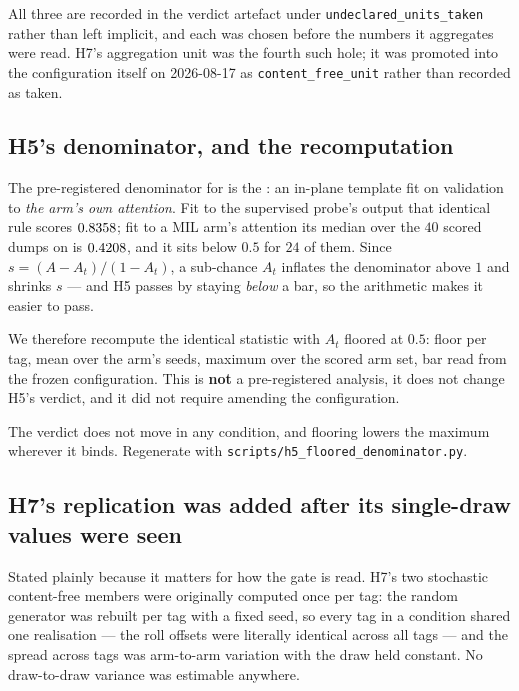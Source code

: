 \documentclass[10pt]{article}
\begin{document}
All three are recorded in the verdict artefact under
\texttt{undeclared\_units\_taken} rather than left implicit, and each was chosen
before the numbers it aggregates were read. H7's aggregation unit was the fourth
such hole; it was promoted into the configuration itself on 2026-08-17 as
\texttt{content\_free\_unit} rather than recorded as taken.

\subsection{H5's denominator, and the recomputation}
\label{sec:h5}

The pre-registered denominator for \pns{} is the \attden{}: an in-plane
template fit on validation to \emph{the arm's own attention}. Fit to the
supervised probe's output that identical rule scores $0.8358$; fit to a MIL
arm's attention its median over the $40$ scored dumps on \condA{} is
$0.4208$, and it sits below $0.5$ for $24$ of them. Since $s = (A - A_t)/(1 - A_t)$, a sub-chance $A_t$
inflates the denominator above $1$ and shrinks $s$ --- and H5 passes by staying
\emph{below} a bar, so the arithmetic makes it easier to pass.

We therefore recompute the identical statistic with $A_t$ floored at $0.5$:
floor per tag, mean over the arm's seeds, maximum over the scored arm set, bar
read from the frozen configuration. This is \textbf{not} a pre-registered
analysis, it does not change H5's verdict, and it did not require amending the
configuration.

\begin{center}

\end{center}

\noindent The verdict does not move in any condition, and flooring lowers the
maximum wherever it binds. Regenerate with
\texttt{scripts/h5\_floored\_denominator.py}.

\subsection{H7's replication was added after its single-draw values were seen}
\label{sec:h7}

Stated plainly because it matters for how the gate is read. H7's two stochastic
content-free members were originally computed once per tag: the random generator
was rebuilt per tag with a fixed seed, so every tag in a condition shared one
realisation --- the roll offsets were literally identical across all tags --- and
the spread across tags was arm-to-arm variation with the draw held constant. No
draw-to-draw variance was estimable anywhere.
\end{document}
